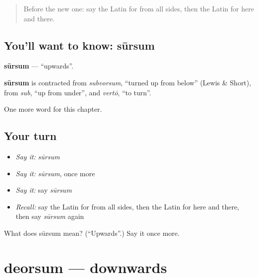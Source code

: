 \label{lesson:LA-C264-sursum}



\begin{quote}
Before the new one: say the Latin for from all sides, then the Latin for here and there.
\end{quote}

\subsection*{You'll want to know: sūrsum}
\textbf{sūrsum} — \textquotedblleft{}upwards\textquotedblright{}.

\begin{cousinweb}
\textbf{sūrsum} is contracted from \emph{subvorsum}, \textquotedblleft{}turned up from below\textquotedblright{} (Lewis \& Short), from \emph{sub}, \textquotedblleft{}up from under\textquotedblright{}, and \emph{vertō}, \textquotedblleft{}to turn\textquotedblright{}.
\end{cousinweb}

\begin{grammarlens}[title={What you've built}]
One more word for this chapter.
\end{grammarlens}

\subsection*{Your turn}
\begin{itemize}
\raggedright
  \item \emph{Say it:} \emph{sūrsum}
  \item \emph{Say it:} \emph{sūrsum}, once more
  \item \emph{Say it:} say \emph{sūrsum}
  \item \emph{Recall:} say the Latin for from all sides, then the Latin for here and there, then say \emph{sūrsum} again
\end{itemize}

\begin{tcolorbox}[breakable,colback=teal!4,colframe=teal!35!black,title={Before you move on}]
What does sūrsum mean? (\textquotedblleft{}Upwards\textquotedblright{}.) Say it once more.
\end{tcolorbox}
\section[deorsum]{deorsum — downwards}

\label{lesson:LA-C264-deorsum}



